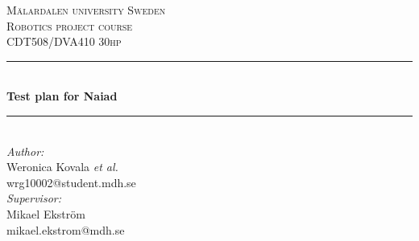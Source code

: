 \documentclass[10pt,a4paper]{article}
\begin{document}
\begin{titlepage}

\newcommand{\HRule}{\rule{\linewidth}{0.5mm}} %

\center %
 

\textsc{\LARGE Mälardalen university Sweden}\\[1.5cm] %
\textsc{\Large Robotics project course }\\[0.5cm] %
\textsc{\large CDT508/DVA410 30hp}\\[0.5cm] %


\HRule \\[0.4cm]
{ \huge \bfseries Test plan for Naiad}\\[0.4cm] %
\HRule \\[1.5cm]
 

\large
\emph{Author:}\\
Weronica Kovala \textit{et al.} \\ wrg10002@student.mdh.se %
\vspace{0.3cm}
\\

\emph{Supervisor:} \\
Mikael Ekström \\
mikael.ekstrom@mdh.se
\vspace{1cm}




\end{titlepage}
\end{document}
